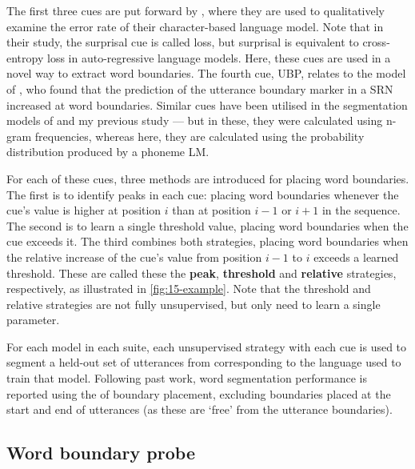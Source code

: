 The first three cues are put forward by \citet{al-rfou_character-level_2019}, where they are used to qualitatively examine the error rate of their character-based language model. Note that in their study, the surprisal cue is called loss, but surprisal is equivalent to cross-entropy loss in auto-regressive language models. Here, these cues are used in a novel way to extract word boundaries. The fourth cue, UBP, relates to the model of \citet{christiansen1998learning}, who found that the prediction of the utterance boundary marker in a SRN increased at word boundaries. Similar cues have been utilised in the segmentation models of \citet{ccoltekin2014explicit} and my previous study \citep{goriely2023word} --- but in these, they were calculated using n-gram frequencies, whereas here, they are calculated using the probability distribution produced by a phoneme LM.

For each of these cues, three methods are introduced for placing word boundaries. The first is to identify peaks in each cue: placing word boundaries whenever the cue's value is higher at position $i$ than at position $i-1$ or $i+1$ in the sequence. The second is to learn a single threshold value, placing word boundaries when the cue exceeds it. The third combines both strategies, placing word boundaries when the relative increase of the cue's value from position $i-1$ to $i$ exceeds a learned threshold. These are called these the \textbf{peak}, \textbf{threshold} and \textbf{relative} strategies, respectively, as illustrated in \cref{fig:15-example}. Note that the threshold and relative strategies are not fully unsupervised, but only need to learn a single parameter. %

For each model in each suite, each unsupervised strategy with each cue is used to segment a held-out set of utterances from \ipachildes corresponding to the language used to train that model. Following past work, word segmentation performance is reported using the \fscore of boundary placement, excluding boundaries placed at the start and end of utterances (as these are `free' from the utterance boundaries).

\subsection{Word boundary probe}

